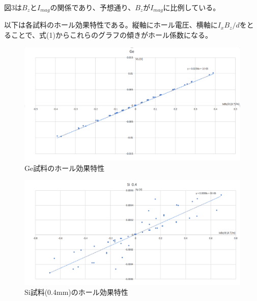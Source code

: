\documentclass[dvipdfmx]{jsarticle}
\begin{document}
図3は$B_{z}$と$I_{mag}$の関係であり、予想通り、$B_{z}$が$I_{mag}$に比例している。

\newpage
以下は各試料のホール効果特性である。縦軸にホール電圧、横軸に$I_{x}B_{z}/d$をとることで、式(1)からこれらのグラフの傾きがホール係数になる。

\begin{figure}[H]
\begin{center}
\includegraphics[scale = 0.6]{Ge.png}
\caption{Ge試料のホール効果特性}
\end{center}
\end{figure}

\begin{figure}[H]
\begin{center}
\includegraphics[scale = 0.6]{Si04.png}
\caption{Si試料(0.4mm)のホール効果特性}
\end{center}
\end{figure}
\end{document}
